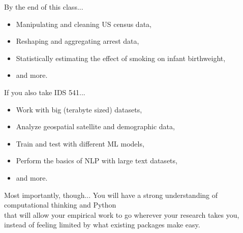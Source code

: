 \documentclass[11pt]{beamer}
\begin{document}
\begin{frame}[c]{By the end of this class...}
\begin{itemize}
	\item Manipulating and cleaning US census data,
	\pause \item Reshaping and aggregating arrest data,
	\pause \item Statistically estimating the effect of smoking on infant birthweight,
	\pause \item and more.
\end{itemize}
\end{frame}

\begin{frame}[c]{If you also take IDS 541...}
\begin{itemize}
	\item Work with big (terabyte sized) datasets,
	\pause \item Analyze geospatial satellite and demographic data,
	\pause \item Train and test with different ML models,
	\pause \item Perform the basics of NLP with large text datasets,
	\pause \item and more.
\end{itemize}
\end{frame}

\begin{frame}[c]{Most importantly, though...}
You will have a strong understanding of computational thinking and Python\\
\pause that will allow your empirical work to go wherever your research takes you, \\
\pause instead of feeling limited by what existing packages make easy.
\end{frame}
\end{document}
